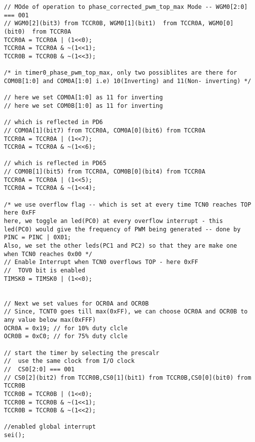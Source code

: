 \documentclass{article}
\begin{document}
\begin{verbatim}
// MOde of operation to phase_corrected_pwm_top_max Mode -- WGM0[2:0] === 001
// WGM0[2](bit3) from TCCR0B, WGM0[1](bit1)  from TCCR0A, WGM0[0](bit0)  from TCCR0A
TCCR0A = TCCR0A | (1<<0);
TCCR0A = TCCR0A & ~(1<<1);
TCCR0B = TCCR0B & ~(1<<3);	

/* in timer0_phase_pwm_top_max, only two possiblites are there for COM0B[1:0] and COM0A[1:0] i.e) 10(Inverting) and 11(Non- inverting) */

// here we set COM0A[1:0] as 11 for inverting
// here we set COM0B[1:0] as 11 for inverting

// which is reflected in PD6
// COM0A[1](bit7) from TCCR0A, COM0A[0](bit6) from TCCR0A
TCCR0A = TCCR0A | (1<<7);
TCCR0A = TCCR0A & ~(1<<6);

// which is reflected in PD65
// COM0B[1](bit5) from TCCR0A, COM0B[0](bit4) from TCCR0A
TCCR0A = TCCR0A | (1<<5);
TCCR0A = TCCR0A & ~(1<<4);

/* we use overflow flag -- which is set at every time TCN0 reaches TOP here 0xFF
here, we toggle an led(PC0) at every overflow interrupt - this led(PC0) would give the frequency of PWM being generated -- done by PINC = PINC | 0X01;
Also, we set the other leds(PC1 and PC2) so that they are make one when TCN0 reaches 0x00 */
// Enable Interrupt when TCN0 overflows TOP - here 0xFF
//  TOV0 bit is enabled
TIMSK0 = TIMSK0 | (1<<0);


// Next we set values for OCR0A and OCR0B
// Since, TCNT0 goes till max(0xFF), we can choose OCR0A and OCR0B to any value below max(0xFFF)
OCR0A = 0x19; // for 10% duty clcle
OCR0B = 0xC0; // for 75% duty clcle

// start the timer by selecting the prescalr
//  use the same clock from I/O clock
//  CS0[2:0] === 001
// CS0[2](bit2) from TCCR0B,CS0[1](bit1) from TCCR0B,CS0[0](bit0) from TCCR0B
TCCR0B = TCCR0B | (1<<0);
TCCR0B = TCCR0B & ~(1<<1);
TCCR0B = TCCR0B & ~(1<<2);

//enabled global interrupt
sei();
\end{verbatim}
\end{document}
